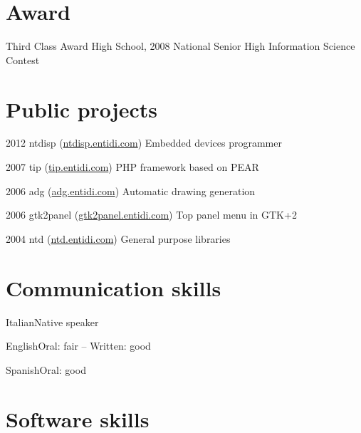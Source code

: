 \documentclass{tccv}
\begin{document}
\begin{CJK*}{UTF8}{bsmi}
\section{Award}

\begin{yearlist}

\item[Third Class Award]{High School, 2008}
     {National Senior High Information Science Contest}
     {}

\end{yearlist}


\section{Public projects}

\begin{yearlist}

\item{2012}
     {ntdisp (\href{http://ntdisp.entidi.com/}{ntdisp.entidi.com})}
     {Embedded devices programmer}

\item{2007}
     {tip (\href{http://tip.entidi.com/}{tip.entidi.com})}
     {PHP framework based on PEAR}

\item{2006}
     {adg (\href{http://adg.entidi.com/}{adg.entidi.com})}
     {Automatic drawing generation}

\item{2006}
     {gtk2panel (\href{http://gtk2panel.entidi.com/}{gtk2panel.entidi.com})}
     {Top panel menu in GTK+2}

\item{2004}
     {ntd (\href{http://ntd.entidi.com/}{ntd.entidi.com})}
     {General purpose libraries}

\end{yearlist}

\section{Communication skills}

\begin{factlist}
\item{Italian}{Native speaker}
\item{English}{Oral: fair -- Written: good}
\item{Spanish}{Oral: good}
\end{factlist}

\section{Software skills}


\end{CJK*}
\end{document}
